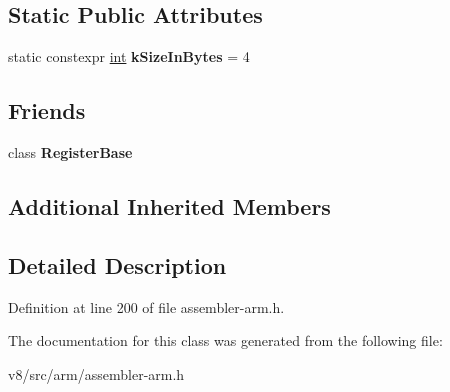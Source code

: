 \subsection*{Static Public Attributes}
\begin{DoxyCompactItemize}
\item 
\mbox{\label{classv8_1_1internal_1_1SwVfpRegister_aeb66149dc3f49de3ece6e9a2dd61896b}} 
static constexpr \mbox{\hyperlink{classint}{int}} {\bfseries k\+Size\+In\+Bytes} = 4
\end{DoxyCompactItemize}
\subsection*{Friends}
\begin{DoxyCompactItemize}
\item 
\mbox{\label{classv8_1_1internal_1_1SwVfpRegister_a762c32bfc1b920b5ead6f1c087b4a400}} 
class {\bfseries Register\+Base}
\end{DoxyCompactItemize}
\subsection*{Additional Inherited Members}


\subsection{Detailed Description}


Definition at line 200 of file assembler-\/arm.\+h.



The documentation for this class was generated from the following file\+:\begin{DoxyCompactItemize}
\item 
v8/src/arm/assembler-\/arm.\+h\end{DoxyCompactItemize}
